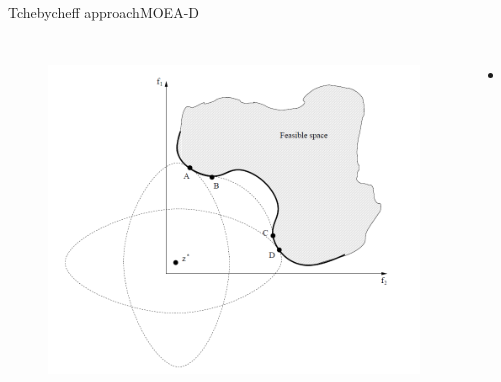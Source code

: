 \begin{frame}{Tchebycheff approach}{MOEA-D}
	\begin{columns}
		\begin{figure}
			\centering
			\includegraphics[width=\linewidth]{figure/tchebycheff}
			\label{fig:tchebycheff}
		\end{figure}
		\begin{minipage}{\textwidth}
			\begin{itemize}%
				\item \begin{equation}
				\nonumber
				\end{equation}
			\end{itemize}
		\end{minipage}
	\end{columns}
\end{frame}

